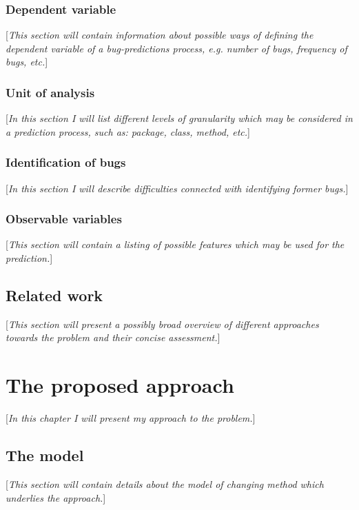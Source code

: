\documentclass{pracamgr}
\begin{document}
\subsection{Dependent variable}
\label{sec:dependent_variable}
[\textit{This section will contain information about possible ways of defining the dependent variable of a bug-predictions process, e.g. number of bugs, frequency of bugs, etc.}]

\subsection{Unit of analysis}
\label{sec:unit_of_analysis}
[\textit{In this section I will list different levels of granularity which may be considered in a prediction process, such as: package, class, method, etc.}]

\subsection{Identification of bugs}
\label{sec:identification}
[\textit{In this section I will describe difficulties connected with identifying former bugs.}]

\subsection{Observable variables}
\label{sec:observable_variables}
[\textit{This section will contain a listing of possible features which may be used for the prediction.}]

\section{Related work}
\label{sec:realted_work}
[\textit{This section will present a possibly broad overview of different approaches towards the problem and their concise assessment.}]

\chapter{The proposed approach}
\label{cha:approach}
[\textit{In this chapter I will present my approach to the problem.}]

\section{The model}
\label{sec:model}
[\textit{This section will contain details about the model of changing method which underlies the approach.}]
\end{document}

